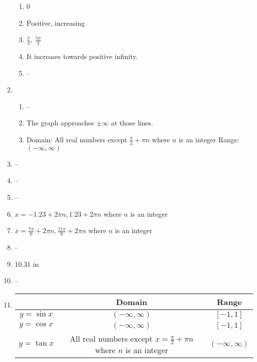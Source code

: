 \documentclass{article}
\begin{document}
\begin{enumerate}
	\begin{enumerate}
	
	\item 0
	
	\item Positive, increasing
	
	\item $\frac{\pi}{4}, \ \frac{5\pi}{4}$
	
	\item It increases towards positive infinity.
	
	\item --
	
	\end{enumerate}
	
\item

	\begin{enumerate}
	
	\item --
	
	\item The graph approaches $\pm \infty$ at those lines.
	
	\item Domain: All real numbers except $\frac{\pi}{2} + \pi n$ where $n$ is an integer \newline
		Range: $(-\infty, \infty)$
	
	\end{enumerate}

\item --

\item --

\item --
	
\item $x = -1.23 + 2\pi n, 1.23 + 2\pi n$ where $n$ is an integer

\item $x = \frac{7\pi}{6} + 2\pi n, \frac{11\pi}{6} + 2 \pi n$ where $n$ is an integer

\item --

\item 10.31 in

\item --

\item

	\begin{tabular}{| c | c | c |}
	
	\hline
	& Domain & Range \\
	\hline
	$y = \sin{x}$ & $(-\infty, \infty)$ & $[-1,1]$ \\
	\hline
	$y = \cos{x}$ & $(-\infty, \infty)$ & $[-1, 1]$ \\
	\hline
	$y = \tan{x}$ & All real numbers except $x = \frac{\pi}{2} + \pi n$ where $n$ is an integer & $(-\infty, \infty)$ \\
	\hline
	
	\end{tabular}

\end{enumerate}
\end{document}

